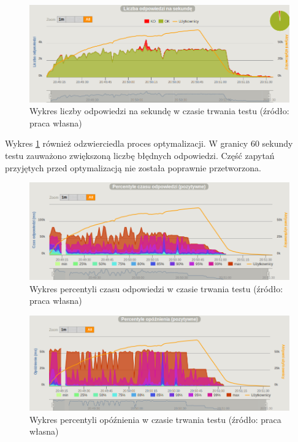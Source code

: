 \documentclass[12pt,twoside]{article}
\begin{document}
\begin{figure}[htbp]
\centering
\includegraphics[resolution=150]{test_results/java/simpletest/screenshots/responses.png}
\caption{Wykres liczby odpowiedzi na sekundę w czasie trwania testu (źródło: praca własna)}
\label{java:simple:responses}
\end{figure}

Wykres \ref{java:simple:responses} również odzwierciedla proces
optymalizacji. W granicy 60 sekundy testu zauważono zwiększoną liczbę
błędnych odpowiedzi. Część zapytań przyjętych przed optymalizacją nie
została poprawnie przetworzona.

\begin{figure}[htbp]
\centering
\includegraphics[resolution=150]{test_results/java/simpletest/screenshots/response_percentile.png}
\caption{Wykres percentyli czasu odpowiedzi w czasie trwania testu (źródło: praca własna)}
\label{java:simple:response_percentile}
\end{figure}

\begin{figure}[htbp]
\centering
\includegraphics[resolution=150]{test_results/java/simpletest/screenshots/latency_percentile.png}
\caption{Wykres percentyli opóźnienia w czasie trwania testu (źródło: praca własna)}
\label{java:simple:latency_percentile}
\end{figure}
\end{document}
